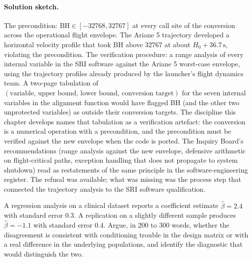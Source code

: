 \paragraph{Solution sketch.}
The precondition: $\mathrm{BH} \in [-32768, 32767]$ at every
call site of the conversion across the operational flight
envelope. The Ariane 5 trajectory developed a horizontal velocity
profile that took $\mathrm{BH}$ above $32767$ at about $H_{0} +
36.7\,\si{\second}$, violating the precondition. The verification
procedure: a range analysis of every internal variable in the
SRI software against the Ariane 5 worst-case envelope, using the
trajectory profiles already produced by the launcher's flight
dynamics team. A two-page tabulation of $(\text{variable, upper
bound, lower bound, conversion target})$ for the seven internal
variables in the alignment function would have flagged BH (and the
other two unprotected variables) as outside their conversion
targets. The discipline this chapter develops names that
tabulation as a verification artefact: the conversion is a numerical
operation with a precondition, and the precondition must be
verified against the new envelope when the code is ported. The
Inquiry Board's recommendations (range analysis against the new
envelope, defensive arithmetic on flight-critical paths, exception
handling that does not propagate to system shutdown) read as
restatements of the same principle in the software-engineering
register. The refusal was available; what was missing was the
process step that connected the trajectory analysis to the SRI
software qualification.

\begin{exercise}
A regression analysis on a clinical dataset reports a coefficient
estimate $\hat{\beta} = 2.4$ with standard error $0.3$. A
replication on a slightly different sample produces $\hat{\beta}
= -1.1$ with standard error $0.4$. Argue, in 200 to 300 words,
whether the disagreement is consistent with conditioning trouble
in the design matrix or with a real difference in the underlying
populations, and identify the diagnostic that would distinguish
the two.
\end{exercise}

